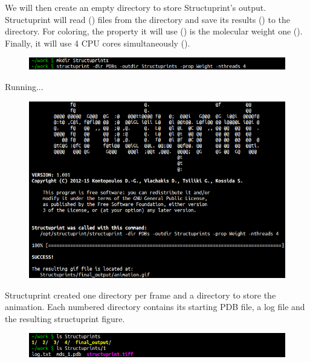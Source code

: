 \documentclass[12pt,a4paper]{article}
\begin{document}
We will then create an empty directory to store Structuprint's output. 
Structuprint will read () files from the  
directory and save its results () to the  
directory. For coloring, the property it will use () is the 
molecular weight one (). Finally, it will use 4 CPU cores 
simultaneously ().
\vspace{-0.5cm}
\begin{figure}[!htbp]
    \centering
	\includegraphics[width=\textwidth]{figures/tutorial/2.png}
\end{figure}

Running...
\vspace{-0.5cm}
\begin{figure}[!htbp]
    \centering
	\includegraphics[width=\textwidth]{figures/tutorial/3.png}
\end{figure}

Structuprint created one directory per frame and a  
directory to store the animation. Each numbered directory contains its 
starting PDB file, a log file and the resulting structuprint figure.
\vspace{-0.5cm}
\begin{figure}[!htbp]
    \centering
	\includegraphics[width=\textwidth]{figures/tutorial/4.png}
\end{figure}
\end{document}
